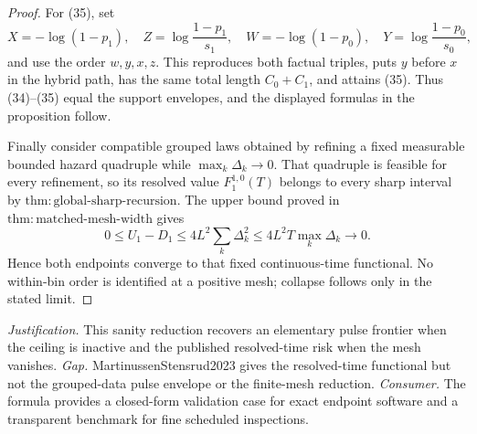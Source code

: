 \documentclass{article}
\begin{document}
\begin{proof}
For (35), set
\[
 X=-\log(1-p_1),\quad Z=\log\frac{1-p_1}{s_1},\quad
 W=-\log(1-p_0),\quad Y=\log\frac{1-p_0}{s_0},              \tag{37}
\]
and use the order \(w,y,x,z\).  This reproduces both factual triples, puts \(y\) before \(x\) in the hybrid path, has the same total length \(C_0+C_1\), and attains (35).  Thus (34)--(35) equal the support envelopes, and the displayed formulas in the proposition follow.

Finally consider compatible grouped laws obtained by refining a fixed measurable bounded hazard quadruple while \(\max_k\Delta_k\to0\).  That quadruple is feasible for every refinement, so its resolved value \(F_1^{1,0}(T)\) belongs to every sharp interval by \(\mathrm{thm{:}global\text{-}sharp\text{-}recursion}\).  The upper bound proved in \(\mathrm{thm{:}matched\text{-}mesh\text{-}width}\) gives
\[
 0\le U_1-D_1\le4L^2\sum_k\Delta_k^2
 \le4L^2T\max_k\Delta_k\longrightarrow0.                 \tag{38}
\]
Hence both endpoints converge to that fixed continuous-time functional.  No within-bin order is identified at a positive mesh; collapse follows only in the stated limit.
\end{proof}
\par\smallskip\noindent \textit{Justification.} This sanity reduction recovers an elementary pulse frontier when the ceiling is inactive and the published resolved-time risk when the mesh vanishes. \textit{Gap.} MartinussenStensrud2023 gives the resolved-time functional but not the grouped-data pulse envelope or the finite-mesh reduction. \textit{Consumer.} The formula provides a closed-form validation case for exact endpoint software and a transparent benchmark for fine scheduled inspections.
\end{document}
